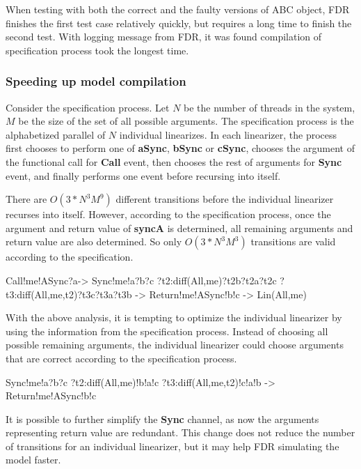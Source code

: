 \documentclass{article}
\begin{document}
When testing with both the correct and the faulty versions of ABC object, FDR finishes the first test case relatively quickly, but requires a long time to finish the second test. With logging message from FDR, it was found compilation of specification process took the longest time. 

\subsubsection{Speeding up model compilation}
Consider the specification process. Let $N$ be the number of threads in the system, $M$ be the size of the set of all possible arguments. The specification process is the alphabetized parallel of $N$ individual linearizes. In each linearizer, the process first chooses to perform one of \textbf{aSync}, \textbf{bSync} or \textbf{cSync}, chooses the argument of the functional call for \textbf{Call} event, then chooses the rest of arguments for \textbf{Sync} event, and finally performs one event before recursing into itself.

There are $O(3*N^3M^9)$ different transitions before the individual linearizer recurses into itself. However, according to the specification process, once the argument and return value of \textbf{syncA} is determined, all remaining arguments and return value are also determined. So only $O(3*N^3M^3)$ transitions are valid according to the specification. 

\begin{cspm}
  Call!me!ASync?a->
    Sync!me!a?b?c 
        ?t2:diff(All,{me})?t2b?t2a?t2c 
        ?t3:diff(All,{me,t2})?t3c?t3a?t3b ->
    Return!me!ASync!b!c ->
    Lin(All,me)
\end{cspm}
    
With the above analysis, it is tempting to optimize the individual linearizer by using the information from the specification process. Instead of choosing all possible remaining arguments, the individual linearizer could choose arguments that are correct according to the specification process.

\begin{cspm}
  Sync!me!a?b?c 
      ?t2:diff(All,{me})!b!a!c
      ?t3:diff(All,{me,t2})!c!a!b ->
  Return!me!ASync!b!c
\end{cspm}

It is possible to further simplify the \textbf{Sync} channel, as now the arguments representing return value are redundant. This change does not reduce the number of transitions for an individual linearizer, but it may help FDR simulating the model faster.
\end{document}
